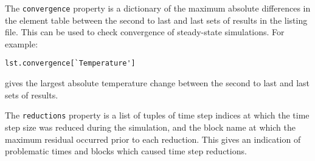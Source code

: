 The \texttt{convergence} property is a dictionary of the maximum absolute differences in the element table between the second to last and last sets of results in the listing file.  This can be used to check convergence of steady-state simulations.  For example:

\begin{verbatim}
lst.convergence[`Temperature']
\end{verbatim}

gives the largest absolute temperature change between the second to last and last sets of results.

The \texttt{reductions} property is a list of tuples of time step indices at which the time step size was reduced during the simulation, and the block name at which the maximum residual occurred prior to each reduction.  This gives an indication of problematic times and blocks which caused time step reductions.

